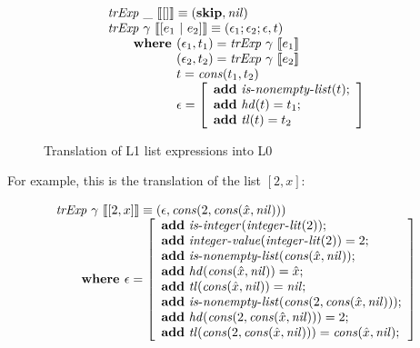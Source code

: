 \begin{figure}
\[
\begin{array}{l}
\trExp{\_}{[]} \equiv (
  \skipE, \mathit{nil}
)\\
\trExp{\gamma}{[e_1~|~e_2]} \equiv (\epsilon_1;\epsilon_2;\epsilon, t)\\
  \qquad \textbf{where } (\epsilon_1, t_1) = \trExp{\gamma}{e_1}\\ 
  \qquad \phantom{\textbf{where }} (\epsilon_2, t_2) = \trExp{\gamma}{e_2}\\ 
  \qquad \phantom{\textbf{where }} t = \mathit{cons}(t_1, t_2)\\ 
  \qquad \phantom{\textbf{where }} \epsilon = \left[
    \begin{array}{l}
      \addE~\isnelist{t};\\
      \addE~\mathit{hd}(t) = t_1;\\
      \addE~\mathit{tl}(t) = t_2\\
    \end{array}
  \right]
\end{array}
\]
\caption{Translation of L1 list expressions into L0}
\label{fig:listtr}
\end{figure}

For example, this is the translation of the list $[2, x]$:

\[
\begin{array}{l}
\mathit{trExp}~\gamma~\llbracket[2, x]\rrbracket \equiv (\epsilon, \mathit{cons}(2, \mathit{cons}(\hat{x}, \mathit{nil})))\\
\qquad \textbf{where } \epsilon = \left[ 
\begin{array}{l}
\textbf{add}~\mathit{is\mbox{-}integer}(\mathit{integer\mbox{-}lit}(2));\\
\textbf{add}~\mathit{integer\mbox{-}value}(\mathit{integer\mbox{-}lit}(2)) = 2;\\
\textbf{add}~\mathit{is\mbox{-}nonempty\mbox{-}list}(\mathit{cons}(\hat{x}, \mathit{nil}));\\
\textbf{add}~\mathit{hd}(\mathit{cons}(\hat{x}, \mathit{nil})) = \hat{x};\\
\textbf{add}~\mathit{tl}(\mathit{cons}(\hat{x}, \mathit{nil})) = \mathit{nil};\\
\textbf{add}~\mathit{is\mbox{-}nonempty\mbox{-}list}(\mathit{cons}(2, \mathit{cons}(\hat{x}, \mathit{nil})));\\
\textbf{add}~\mathit{hd}(\mathit{cons}(2, \mathit{cons}(\hat{x}, \mathit{nil}))) = 2;\\
\textbf{add}~\mathit{tl}(\mathit{cons}(2, \mathit{cons}(\hat{x}, \mathit{nil}))) = \mathit{cons}(\hat{x}, \mathit{nil});\\
\end{array}
\right]
\end{array}
\]

